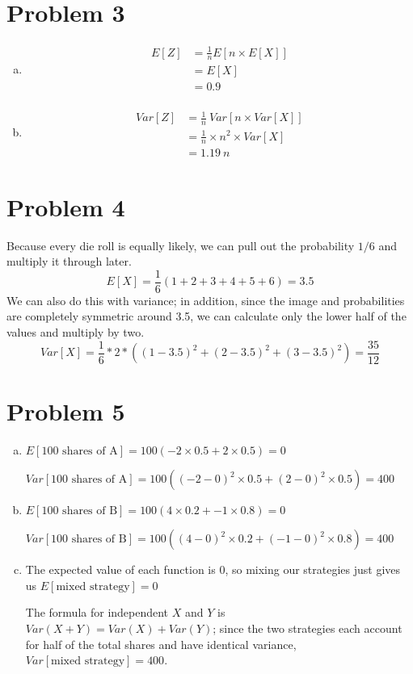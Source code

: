 \documentclass[11pt]{article}
\begin{document}
\section*{Problem 3}
\begin{enumerate}[(a)]
	\item
		\begin{align*}
			E[Z] &= \frac{1}{n} E[n \times E[X]] \\
			&= E[X] \\
			&= 0.9 \\
		\end{align*}
	\item
		\begin{align*}
			Var[Z] &= \frac{1}{n}\ Var[n \times Var[X]] \\
			&= \frac{1}{n} \times n^2 \times Var[X] \\
			&= 1.19\ n
		\end{align*}
	
\end{enumerate}


\section*{Problem 4}
Because every die roll is equally likely, we can pull out the probability $1/6$ and multiply it through later.
	\[E[X] = \dfrac{1}{6}( 1+2+3+4+5+6) = 3.5 \]
We can also do this with variance; in addition, since the image and probabilities are completely symmetric around 3.5, we can calculate only the lower half of the values and multiply by two.
	\[Var[X] = \dfrac{1}{6} * 2 * ( (1-3.5)^2 + (2 - 3.5)^2 + (3-3.5)^2 ) = \dfrac{35}{12} \]
	
\section*{Problem 5}
\begin{enumerate}[(a)]
	\item 
	$E[\text{100 shares of A}] = 100(-2 \times 0.5 + 2 \times 0.5) = 0$
	
	$Var[\text{100 shares of A} ] =100( (-2 -0)^2  \times 0.5 + (2-0)^2 \times 0.5) = 400$
	
	\item
	$E[\text{100 shares of B}] = 100(4 \times 0.2 + -1 \times 0.8) = 0$
	
	$Var[\text{100 shares of B}] = 100((4-0)^2 \times 0.2 + (-1 - 0)^2 \times 0.8) = 400$
	
	\item
	The expected value of each function is 0, so mixing our strategies just gives us $E[\text{mixed strategy}] = 0$
	
	The formula for independent $X$ and $Y$ is $Var(X+Y) = Var(X) +Var(Y)$; since the two strategies each account for half of the total shares and have identical variance, $Var[\text{mixed strategy}] = 400$.

\end{enumerate}
\end{document}
